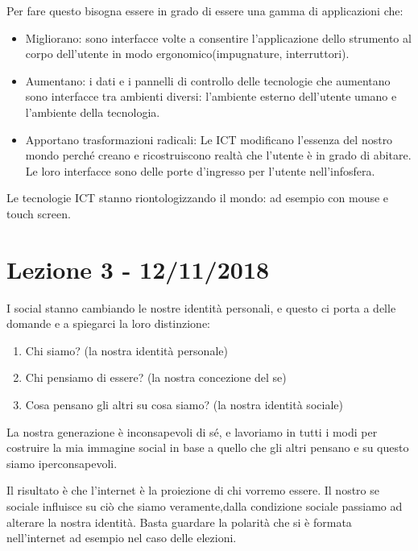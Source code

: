 \documentclass[a4page, 11pt]{article}
\begin{document}
Per fare questo bisogna essere in grado di essere una gamma di
applicazioni che:

\begin{itemize}
	 
	\item
	Migliorano: sono interfacce volte a consentire l'applicazione dello
	strumento al corpo dell'utente in modo ergonomico(impugnature,
	interruttori).
	\item
	Aumentano: i dati e i pannelli di controllo delle tecnologie che
	aumentano sono interfacce tra ambienti diversi: l'ambiente esterno
	dell'utente umano e l'ambiente della tecnologia.
	\item
	Apportano trasformazioni radicali: Le ICT modificano l'essenza del
	nostro mondo perché creano e ricostruiscono realtà che l'utente è in
	grado di abitare. Le loro interfacce sono delle porte d'ingresso per
	l'utente nell'infosfera.
\end{itemize}

Le tecnologie ICT stanno riontologizzando il mondo: ad esempio con mouse
e touch screen.
\section*{Lezione 3 - 12/11/2018}

I social stanno cambiando le nostre identità personali, e questo ci
porta a delle domande e a spiegarci la loro distinzione:

\begin{enumerate}
	\def\labelenumi{\arabic{enumi}.}
	 
	\item
	Chi siamo? (la nostra identità personale)
	\item
	Chi pensiamo di essere? (la nostra concezione del se)
	\item
	Cosa pensano gli altri su cosa siamo? (la nostra identità sociale)
\end{enumerate}

La nostra generazione è inconsapevoli di sé, e lavoriamo in tutti i modi
per costruire la mia immagine social in base a quello che gli altri
pensano e su questo siamo iperconsapevoli.

Il risultato è che l'internet è la proiezione di chi vorremo essere.
Il nostro se sociale influisce su ciò che siamo veramente,dalla 
condizione sociale passiamo ad alterare la nostra identità.
Basta guardare la polarità che si è formata nell'internet ad esempio nel
caso delle elezioni.
\end{document}
